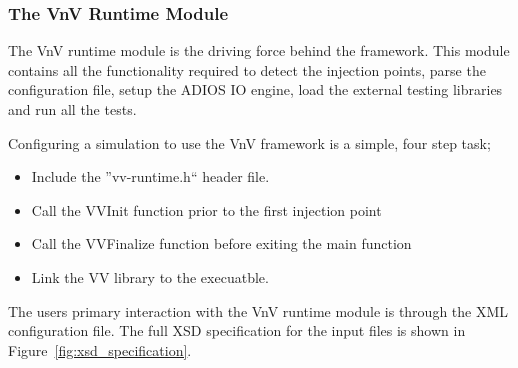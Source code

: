 \subsubsection{The VnV Runtime Module}

The VnV runtime module is the driving force behind the framework. This module contains all the functionality required to detect the injection points, parse the
configuration file, setup the ADIOS IO engine, load the external testing libraries and run all the tests.

Configuring a simulation to use the VnV framework is a simple, four step task;

\begin{itemize}
 \item Include the ''vv-runtime.h`` header file.
 \item Call the VVInit function prior to the first injection point
 \item Call the VVFinalize function before exiting the main function
 \item Link the VV library to the execuatble. 
\end{itemize}

The users primary interaction with the VnV runtime module is through the XML configuration file. The full XSD specification for the input 
files is shown in Figure~\ref{fig:xsd_specification}. 

